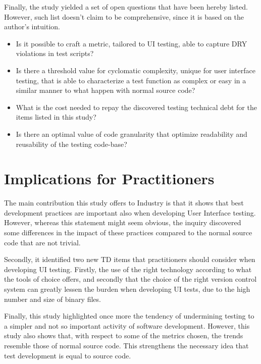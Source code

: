 Finally, the study yielded a set of open questions that have been hereby listed. However, such list doesn't claim to be comprehensive, since it is based on the author's intuition.

\begin{itemize}

    \item Is it possible to craft a metric, tailored to UI testing, able to capture DRY violations in test scripts?
    
    \item Is there a threshold value for cyclomatic complexity, unique for user interface testing, that is able to characterize a test function as complex or easy in a similar manner to what happen with normal source code?
    
    \item What is the cost needed to repay the discovered testing technical debt for the items listed in this study?
    
    \item Is there an optimal value of code granularity that optimize readability and reusability of the testing code-base?
    
    
\end{itemize}


\section{Implications for Practitioners}
The main contribution this study offers to Industry is that it shows that best development practices are important also when developing User Interface testing. However, whereas this statement might seem obvious, the inquiry discovered some differences in the impact of these practices compared to the normal source code that are not trivial.

Secondly, it identified two new TD items that practitioners should consider when developing UI testing. Firstly, the use of the right technology according to what the tools of choice offers, and secondly that the choice of the right version control system can greatly lessen the burden when developing UI tests, due to the high number and size of binary files.

Finally, this study highlighted once more the tendency of undermining testing to a simpler and not so important activity of software development. However, this study also shows that, with respect to some of the metrics chosen, the trends resemble those of normal source code. This strengthens the necessary idea that test development is equal to source code.